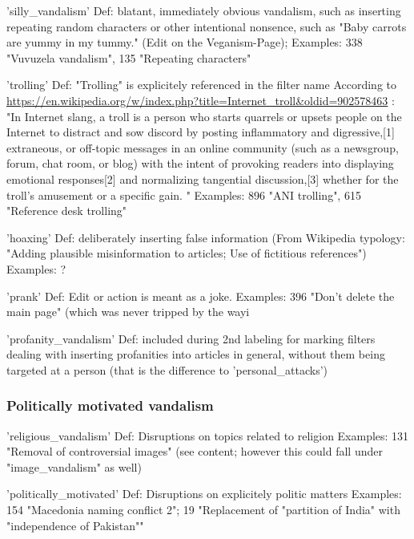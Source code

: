 'silly\_vandalism'
  Def: blatant, immediately obvious vandalism, such as inserting repeating random characters or other intentional nonsence, such as "Baby carrots are yummy in my tummy." (Edit on the Veganism-Page);
  Examples: 338 "Vuvuzela vandalism", 135 "Repeating characters"

'trolling'
  Def: "Trolling" is explicitely referenced in the filter name
  According to \url{https://en.wikipedia.org/w/index.php?title=Internet_troll&oldid=902578463} :
  "In Internet slang, a troll is a person who starts quarrels or upsets people on the Internet to distract and sow discord by posting inflammatory and digressive,[1] extraneous, or off-topic messages in an online community (such as a newsgroup, forum, chat room, or blog) with the intent of provoking readers into displaying emotional responses[2] and normalizing tangential discussion,[3] whether for the troll's amusement or a specific gain. "
  Examples: 896 "ANI trolling", 615 "Reference desk trolling"

'hoaxing'
  Def: deliberately inserting false information (From Wikipedia typology: "Adding plausible misinformation to articles; Use of fictitious references")
  Examples: ?

'prank'
  Def: Edit or action is meant as a joke. %
  Examples: 396 "Don't delete the main page" (which was never tripped by the way^^)

'profanity\_vandalism'
  Def: included during 2nd labeling for marking filters dealing with inserting profanities into articles in general, without them being targeted at a person (that is the difference to 'personal\_attacks')

\subsubsection{Politically motivated vandalism}
'religious\_vandalism'
Def: Disruptions on topics related to religion
Examples: 131 "Removal of controversial images" (see content; however this could fall under "image\_vandalism" as well)

'politically\_motivated'
Def: Disruptions on explicitely politic matters
Examples: 154 "Macedonia naming conflict 2"; 19 "Replacement of "partition of India" with "independence of Pakistan""


